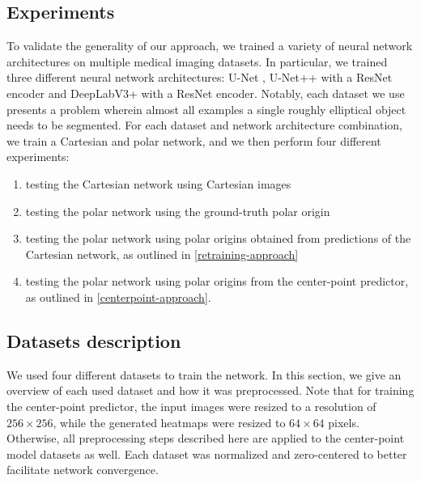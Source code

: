   \subsection{Experiments} \label{experiments}
  
To validate the generality of our approach, we trained a variety of neural network architectures on 
multiple medical imaging datasets. In particular, we trained three different neural network 
architectures: U-Net \cite{ronnebergerUNetConvolutionalNetworks2015}, U-Net++ 
\cite{zhouUNetNestedUNet2018a} with a ResNet encoder and DeepLabV3+ 
\cite{chenEncoderDecoderAtrousSeparable2018a} with a ResNet encoder. Notably, each dataset we use presents a problem wherein almost all examples a single roughly elliptical object needs to be segmented. 
For each dataset and network architecture combination, we train a Cartesian and polar network, and we then 
perform four different experiments: 

\begin{enumerate}
	\item{testing the Cartesian network using Cartesian images}
	\item{testing the polar network using the ground-truth polar origin}
	\item{testing the polar network using polar origins obtained from predictions of the Cartesian network, as outlined in \ref{retraining-approach}}
	\item{testing the polar network using polar origins from the center-point predictor, as outlined in \ref{centerpoint-approach}}.
\end{enumerate}

    \subsection{Datasets description}

We used four different datasets to train the network. In this section, we give an overview of each used dataset and how it was preprocessed. Note that for training the center-point predictor, the input images were resized to a resolution of $256 \times 256$, while the generated heatmaps were resized to $64 \times 64$ pixels. Otherwise, all preprocessing steps described here are applied to the center-point model datasets as well. Each dataset was normalized and zero-centered to better facilitate network convergence. 

